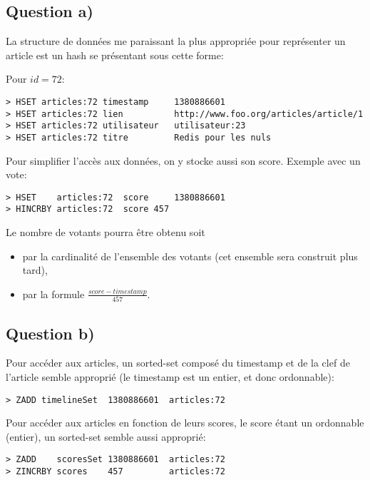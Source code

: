 \documentclass[article,a4paper,12pt]{article}
\begin{document}
\subsection{Question a)}
\label{sec:orgheadline3}

La structure de données me paraissant la plus appropriée pour représenter un
article est un hash se présentant sous cette forme:

Pour \(id = 72\):

\begin{verbatim}
> HSET articles:72 timestamp     1380886601
> HSET articles:72 lien          http://www.foo.org/articles/article/1
> HSET articles:72 utilisateur   utilisateur:23
> HSET articles:72 titre         Redis pour les nuls
\end{verbatim}

Pour simplifier l'accès aux données, on y stocke aussi son score. Exemple avec un vote:

\begin{verbatim}
> HSET    articles:72  score     1380886601
> HINCRBY articles:72  score 457
\end{verbatim}

Le nombre de votants pourra être obtenu soit
\begin{itemize}
\item par la cardinalité de l'ensemble des votants (cet ensemble sera construit plus tard),
\item par la formule \(\frac{score-timestamp}{457}\).
\end{itemize}

\subsection{Question b)}
\label{sec:orgheadline4}

Pour accéder aux articles, un sorted-set composé du timestamp et de la clef de
l'article semble approprié (le timestamp est un entier, et donc ordonnable):

\begin{verbatim}
> ZADD timelineSet  1380886601  articles:72
\end{verbatim}

Pour accéder aux articles en fonction de leurs scores, le score étant un
ordonnable (entier), un sorted-set semble aussi approprié:

\begin{verbatim}
> ZADD    scoresSet 1380886601  articles:72
> ZINCRBY scores    457         articles:72
\end{verbatim}
\end{document}
